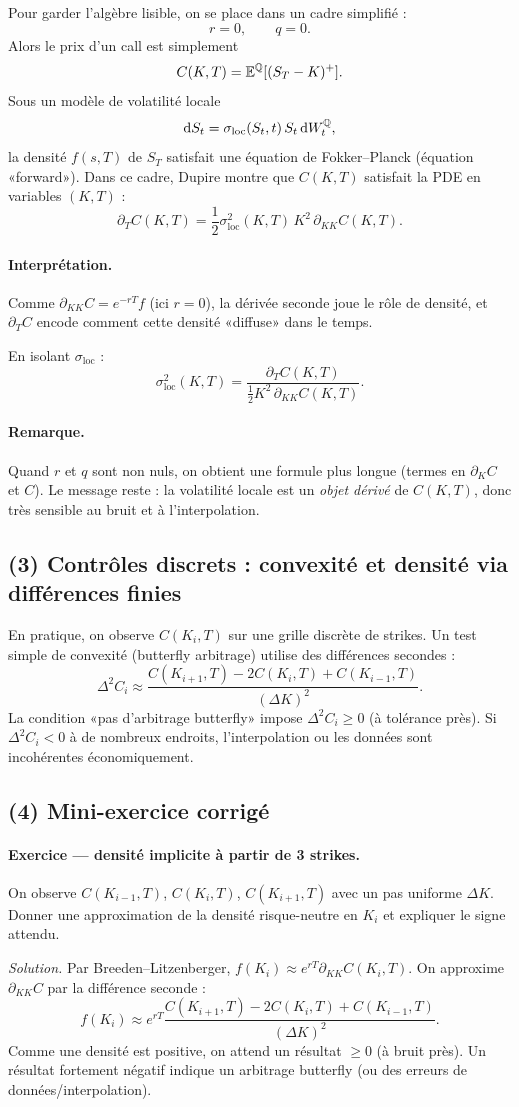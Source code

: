 Pour garder l'algèbre lisible, on se place dans un cadre simplifié :
\[
r=0,\qquad q=0.
\]
Alors le prix d'un call est simplement
\[
C(K,T)=\mathbb{E}^{\mathbb{Q}}[(S_T-K)^+].
\]
Sous un modèle de volatilité locale
\[
\mathrm{d} S_t=\sigma_{\mathrm{loc}}(S_t,t)\,S_t\,\mathrm{d} W_t^{\mathbb{Q}},
\]
la densité $f(s,T)$ de $S_T$ satisfait une équation de Fokker--Planck (équation «forward»).
Dans ce cadre, Dupire montre que $C(K,T)$ satisfait la PDE en variables $(K,T)$ :
\[
\partial_T C(K,T)=\frac12\sigma_{\mathrm{loc}}^2(K,T)\,K^2\,\partial_{KK}C(K,T).
\]
\paragraph{Interprétation.}
Comme $\partial_{KK}C=e^{-rT}f$ (ici $r=0$), la dérivée seconde joue le rôle de densité, et $\partial_T C$ encode comment cette densité «diffuse» dans le temps.

En isolant $\sigma_{\mathrm{loc}}$ :
\[
\boxed{
\sigma_{\mathrm{loc}}^2(K,T)=\frac{\partial_T C(K,T)}{\tfrac12 K^2\,\partial_{KK}C(K,T)}.
}
\]
\paragraph{Remarque.}
Quand $r$ et $q$ sont non nuls, on obtient une formule plus longue (termes en $\partial_K C$ et $C$). Le message reste : la volatilité locale est un \emph{objet dérivé} de $C(K,T)$, donc très sensible au bruit et à l'interpolation.

\subsection*{(3) Contrôles discrets : convexité et densité via différences finies}
En pratique, on observe $C(K_i,T)$ sur une grille discrète de strikes.
Un test simple de convexité (butterfly arbitrage) utilise des différences secondes :
\[
\Delta^2 C_i \approx \frac{C(K_{i+1},T)-2C(K_i,T)+C(K_{i-1},T)}{(\Delta K)^2}.
\]
La condition «pas d'arbitrage butterfly» impose $\Delta^2 C_i\ge 0$ (à tolérance près).
Si $\Delta^2 C_i<0$ à de nombreux endroits, l'interpolation ou les données sont incohérentes économiquement.

\subsection*{(4) Mini-exercice corrigé}
\paragraph{Exercice --- densité implicite à partir de 3 strikes.}
On observe $C(K_{i-1},T)$, $C(K_i,T)$, $C(K_{i+1},T)$ avec un pas uniforme $\Delta K$.
Donner une approximation de la densité risque-neutre en $K_i$ et expliquer le signe attendu.

\emph{Solution.}
Par Breeden--Litzenberger, $f(K_i)\approx e^{rT}\partial_{KK}C(K_i,T)$.
On approxime $\partial_{KK}C$ par la différence seconde :
\[
f(K_i)\approx e^{rT}\frac{C(K_{i+1},T)-2C(K_i,T)+C(K_{i-1},T)}{(\Delta K)^2}.
\]
Comme une densité est positive, on attend un résultat $\ge 0$ (à bruit près). Un résultat fortement négatif indique un arbitrage butterfly (ou des erreurs de données/interpolation).
